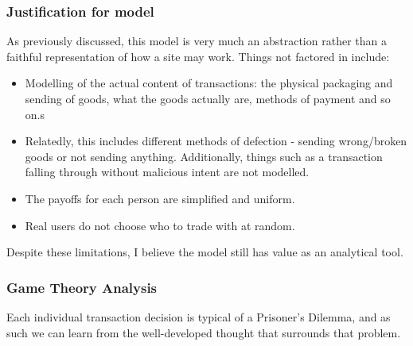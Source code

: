 \documentclass{article}
\begin{document}
\subsubsection{Justification for model}
\label{sec:justification-model}
As previously discussed, this model is very much an abstraction rather than a faithful representation of how a site may work. Things not factored in include:
\begin{itemize}
	\item Modelling of the actual content of transactions: the physical packaging and sending of goods, what the goods actually are, methods of payment and so on.s
	\item Relatedly, this includes different methods of defection - sending wrong/broken goods or not sending anything. Additionally, things such as a transaction falling through without malicious intent are not modelled.
	\item The payoffs for each person are simplified and uniform.
	\item Real users do not choose who to trade with at random.
\end{itemize}

Despite these limitations, I believe the model still has value as an analytical tool.


\subsubsection{Game Theory Analysis}
\label{sec:game-theory}
Each individual transaction decision is typical of a Prisoner's Dilemma, and as such we can learn from the well-developed thought that surrounds that problem.
\end{document}
